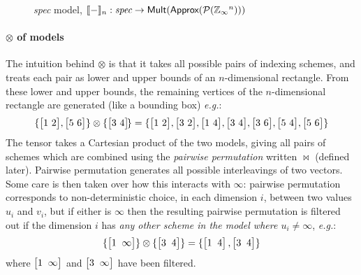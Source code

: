\documentclass[10pt,preprint]{sigplanconf}
\theoremstyle{definition}
\newcommand{\eg}{\emph{e.g.}}
\newcommand{\interp}[1]{\llbracket{#1}\rrbracket}
\newcommand{\vtwohs}[2]{\setlength{\arraycolsep}{0em}
\left[\begin{array}{cc}#1 \, & \, #2\end{array}\right]\!}
\newcommand{\vtwoh}[2]{\setlength{\arraycolsep}{0em}
\left[\begin{array}{cc}#1 \; & \; #2\end{array}\right]}
\begin{document}

%


%

\begin{figure}

\caption{\textit{spec} model,
$\interp{-}_n : \textit{spec} \rightarrow \textsf{Mult}(\textsf{Approx}(\mathcal{P}(\domainVal{}^n)))$}
\label{fig:spatial-model}
\vspace{-0.75em}
\end{figure}

\paragraph{$\otimes$ of models}

The intuition behind $\otimes$ is that it takes all possible pairs of
indexing schemes, and treats each pair as lower and upper bounds of an
$n$-dimensional rectangle. From these lower and upper bounds,
the remaining vertices of the $n$-dimensional rectangle are
generated (like a bounding box) \eg{}:
\begin{align*}
\{\vtwohs{1}{2}, \vtwohs{5}{6}\,\} \otimes \{\vtwohs{3}{4}\} =
\{\vtwohs{1}{2}, \vtwohs{3}{2}, \vtwohs{1}{4}, \vtwohs{3}{4},
   \vtwohs{3}{6}, \vtwohs{5}{4}, \vtwohs{5}{6}\,\}
\end{align*}
The tensor takes a Cartesian product of the two models,
giving all pairs of schemes which are combined using the
\emph{pairwise permutation} written $\bowtie$ (defined later).
Pairwise permutation generates all possible interleavings of two
vectors. Some care is then taken over
how this interacts with $\infty$: pairwise permutation
corresponds to non-deterministic choice, in each dimension $i$,
between two values $u_i$ and $v_i$, but if either
is $\infty$ then the resulting pairwise permutation is
filtered out if the dimension $i$ has \emph{any other scheme
in the model where $u_i \neq \infty$}, \eg{}:
\begin{align*}
\{\vtwoh{1}{\infty}\} \otimes \{\vtwoh{3}{4}\} =
\{\vtwoh{1}{4}, \vtwoh{3}{4}\}
\end{align*}
%
where $\vtwoh{1}{\infty}$ and $\vtwoh{3}{\infty}$ have been filtered.
\end{document}
